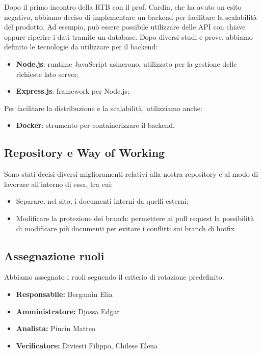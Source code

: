 Dopo il primo incontro della RTB con il prof. Cardin, che ha avuto un esito negativo, abbiamo deciso di implementare un backend per facilitare la scalabilità del prodotto. Ad esempio, può essere possibile utilizzare delle API con chiave oppure riperire i dati tramite un database. Dopo diversi studi e prove, abbiamo definito le tecnologie da utilizzare per il backend:

\begin{itemize}
\item \textbf{Node.js}: runtime JavaScript asincrono, utilizzato per la gestione delle richieste lato server;
\item \textbf{Express.js}: framework per Node.js;
\end{itemize}

Per facilitare la distribuzione e la scalabilità, utilizziamo anche:

\begin{itemize}
\item \textbf{Docker}: strumento per containerizzare il backend.
\end{itemize}

\subsection{Repository e Way of Working}
Sono stati decisi diversi miglioramenti relativi alla nostra repository e al modo di lavorare all'interno di essa, tra cui:
\begin{itemize}
    \item Separare, nel sito, i documenti interni da quelli esterni;
    \item Modificare la protezione dei branch: permettere ai pull request la possibilità di modificare più documenti per evitare i conflitti sui branch di hotfix.
\end{itemize}

\subsection{Assegnazione ruoli}
Abbiamo assegnato i ruoli seguendo il criterio di rotazione predefinito.

\begin{itemize}
    \item \textbf{Responsabile:}  Bergamin Elia
    \item \textbf{Amministratore:} Djossa Edgar
    \item \textbf{Analista:} Pincin Matteo
    \item \textbf{Verificatore:} Diviesti Filippo,  Chilese Elena
\end{itemize}

